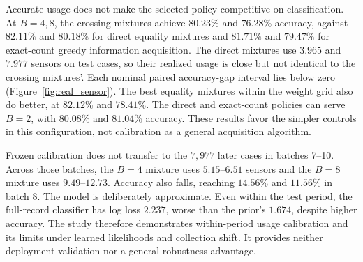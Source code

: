 \documentclass[runningheads]{llncs}
\begin{document}
Accurate usage does not make the selected policy competitive on classification. At $B=4,8$, the crossing mixtures achieve $80.23\%$ and $76.28\%$ accuracy, against $82.11\%$ and $80.18\%$ for direct equality mixtures and $81.71\%$ and $79.47\%$ for exact-count greedy information acquisition. The direct mixtures use $3.965$ and $7.977$ sensors on test cases, so their realized usage is close but not identical to the crossing mixtures'. Each nominal paired accuracy-gap interval lies below zero (Figure~\ref{fig:real_sensor}). The best equality mixtures within the weight grid also do better, at $82.12\%$ and $78.41\%$. The direct and exact-count policies can serve $B=2$, with $80.08\%$ and $81.04\%$ accuracy. These results favor the simpler controls in this configuration, not calibration as a general acquisition algorithm.

Frozen calibration does not transfer to the $7{,}977$ later cases in batches 7--10. Across those batches, the $B=4$ mixture uses $5.15$--$6.51$ sensors and the $B=8$ mixture uses $9.49$--$12.73$. Accuracy also falls, reaching $14.56\%$ and $11.56\%$ in batch 8. The model is deliberately approximate. Even within the test period, the full-record classifier has log loss $2.237$, worse than the prior's $1.674$, despite higher accuracy. The study therefore demonstrates within-period usage calibration and its limits under learned likelihoods and collection shift. It provides neither deployment validation nor a general robustness advantage.
\end{document}
